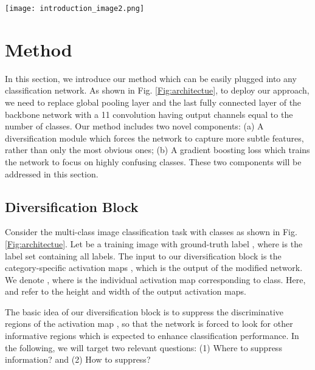 \documentclass[letterpaper]{article} \usepackage{aaai20}  \usepackage{times}  \usepackage{helvet} \usepackage{courier}  \usepackage[hyphens]{url}  \usepackage{graphicx} \usepackage{multirow}
\begin{document}
\begin{figure*}[t]
\centering
\texttt{[image: introduction\_image2.png]}\\
\caption{Overview of our overall architecture. Our method contains two novel components: diversification block and gradient-boosting loss. The diversification block suppresses the discriminative regions of the class activation maps, and hence the network is forced to find alternative informative features. The gradient-booting loss focuses on difficult (confusing) classes for each image and boosts their gradient. As a result, the network moves swiftly (faster convergence) to discriminate the hard classes.}
			\label{Fig:architectue}
\end{figure*}

\section{Method}
In this section, we introduce our method which can be easily plugged into any classification network. As shown in Fig. \ref{Fig:architectue}, to deploy our approach, we need to replace global pooling layer and the last fully connected layer of the backbone network with a 11 convolution having output channels equal to the number of classes. Our method includes two novel components: (a) A diversification module which forces the network to capture more subtle features, rather than only the most obvious ones; (b) A gradient boosting loss  which trains the network to focus on highly confusing classes. These two components will be addressed in this section.


\subsection{Diversification Block}\label{part_enhan}
Consider the multi-class image classification task with  classes as shown in Fig. \ref{Fig:architectue}. Let  be a training image with ground-truth label , where  is the label set containing all labels. The input to our diversification block is the category-specific activation maps , which is the output of the modified network. We denote , where  is the individual activation map corresponding to  class.  Here,  and  refer to the height and width of the output activation maps.  

The basic idea of our diversification block is to suppress the discriminative regions of the activation map , so that the network is forced to look for other informative regions which is expected to enhance classification performance. In the following, we will target two relevant questions: (1) Where to suppress information? and (2) How to suppress?
\end{document}
